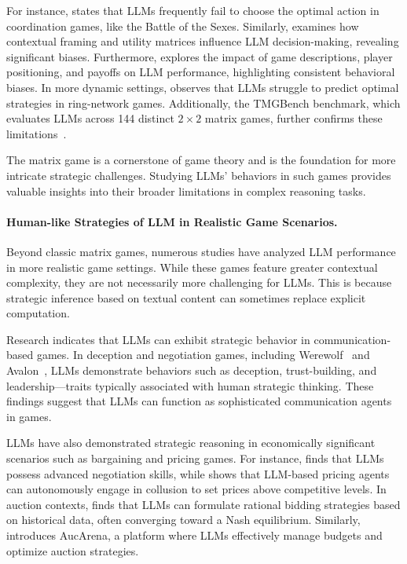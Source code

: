 For instance, \cite{akata2023playing} states that LLMs frequently fail to choose the optimal action in coordination games, like the Battle of the Sexes. 
Similarly, \cite{lore2024strategic} examines how contextual framing and utility matrices influence LLM decision-making, revealing significant biases. 
Furthermore, \cite{herr2024large} explores the impact of game descriptions, player positioning, and payoffs on LLM performance, highlighting consistent behavioral biases.
In more dynamic settings, \cite{fan2024can} observes that LLMs struggle to predict optimal strategies in ring-network games. Additionally, the TMGBench benchmark, which evaluates LLMs across 144 distinct $2 \times 2$ matrix games, further confirms these limitations~\cite{wang2024tmgbench}.

The matrix game is a cornerstone of game theory and is the foundation for more intricate strategic challenges. Studying LLMs' behaviors in such games provides valuable insights into their broader limitations in complex reasoning tasks.

\paragraph{Human-like Strategies of LLM in Realistic Game Scenarios.}
Beyond classic matrix games, numerous studies have analyzed LLM performance in more realistic game settings. While these games feature greater contextual complexity, they are not necessarily more challenging for LLMs. This is because strategic inference based on textual content can sometimes replace explicit computation.

Research indicates that LLMs can exhibit strategic behavior in communication-based games. In deception and negotiation games, including  Werewolf~\cite{xu2023exploring,du2024helmsman} and Avalon~\cite{wang2023avalon,lan2023llm}, LLMs demonstrate behaviors such as deception, trust-building, and leadership—traits typically associated with human strategic thinking. These findings suggest that LLMs can function as sophisticated communication agents in games.

LLMs have also demonstrated strategic reasoning in economically significant scenarios such as bargaining and pricing games. For instance, \cite{llmbargaining} finds that LLMs possess advanced negotiation skills, while \cite{fish2024algorithmic} shows that LLM-based pricing agents can autonomously engage in collusion to set prices above competitive levels. In auction contexts, \cite{guo2024economics} finds that LLMs can formulate rational bidding strategies based on historical data, often converging toward a Nash equilibrium. Similarly, \cite{chen2023put} introduces AucArena, a platform where LLMs effectively manage budgets and optimize auction strategies.

